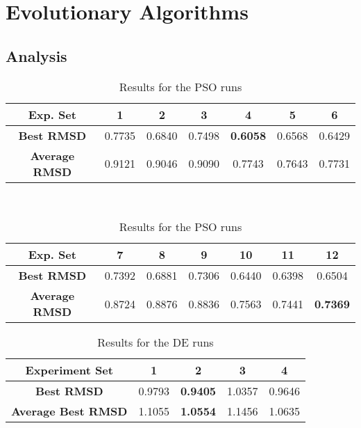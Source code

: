 \section{Evolutionary Algorithms}

\subsection{Analysis}

\begin{table}
	\centering
	\begin{tabular}{ | >{\bfseries}c | c | c | c | c | c | c | }
		\hline
		Exp. Set & 1 & 2 & 3 & 4 & 5 & 6 \\ \hline
		Best RMSD & 0.7735 & 0.6840 & 0.7498 & \textbf{0.6058} & 0.6568 & 0.6429 \\ \hline
		Average RMSD & 0.9121 & 0.9046 & 0.9090 & 0.7743 & 0.7643 & 0.7731 \\ \hline
	\end{tabular}
	\\
	\vspace{3 mm}
	\begin{tabular}{ | >{\bfseries}c | c | c | c | c | c | c | }
		\hline
		Exp. Set & 7 & 8 & 9 & 10 & 11 & 12 \\ \hline
		Best RMSD & 0.7392 & 0.6881 & 0.7306 & 0.6440 & 0.6398 & 0.6504 \\ \hline
		Average RMSD & 0.8724 & 0.8876 & 0.8836 & 0.7563 & 0.7441 & \textbf{0.7369} \\ \hline
	\end{tabular}
	\caption{Results for the PSO runs}
	\label{table:ea-pso-results}
\end{table}

\begin{table}
	\centering
	\begin{tabular}{ | >{\bfseries}c | c | c | c | c | }
		\hline
		Experiment Set & 1 & 2 & 3 & 4 \\ \hline
		Best RMSD & 0.9793 & \textbf{0.9405} & 1.0357 & 0.9646 \\ \hline
		Average Best RMSD & 1.1055 & \textbf{1.0554} & 1.1456 & 1.0635 \\ \hline
	\end{tabular}
	\caption{Results for the DE runs}
	\label{table:ea-de-results}
\end{table}

